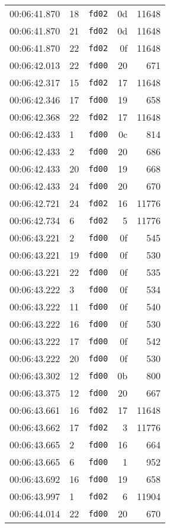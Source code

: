 \documentclass{article}
\begin{document}
\begin{longtable}{lllrr}
00:06:41.870 & 18 & \texttt{fd02} & 0d & 11648 \\
00:06:41.870 & 21 & \texttt{fd02} & 0d & 11648 \\
00:06:41.870 & 22 & \texttt{fd02} & 0f & 11648 \\
00:06:42.013 & 22 & \texttt{fd00} & 20 & 671 \\
00:06:42.317 & 15 & \texttt{fd02} & 17 & 11648 \\
00:06:42.346 & 17 & \texttt{fd00} & 19 & 658 \\
00:06:42.368 & 22 & \texttt{fd02} & 17 & 11648 \\
00:06:42.433 & 1 & \texttt{fd00} & 0c & 814 \\
00:06:42.433 & 2 & \texttt{fd00} & 20 & 686 \\
00:06:42.433 & 20 & \texttt{fd00} & 19 & 668 \\
00:06:42.433 & 24 & \texttt{fd00} & 20 & 670 \\
00:06:42.721 & 24 & \texttt{fd02} & 16 & 11776 \\
00:06:42.734 & 6 & \texttt{fd02} & 5 & 11776 \\
00:06:43.221 & 2 & \texttt{fd00} & 0f & 545 \\
00:06:43.221 & 19 & \texttt{fd00} & 0f & 530 \\
00:06:43.221 & 22 & \texttt{fd00} & 0f & 535 \\
00:06:43.222 & 3 & \texttt{fd00} & 0f & 534 \\
00:06:43.222 & 11 & \texttt{fd00} & 0f & 540 \\
00:06:43.222 & 16 & \texttt{fd00} & 0f & 530 \\
00:06:43.222 & 17 & \texttt{fd00} & 0f & 542 \\
00:06:43.222 & 20 & \texttt{fd00} & 0f & 530 \\
00:06:43.302 & 12 & \texttt{fd00} & 0b & 800 \\
00:06:43.375 & 12 & \texttt{fd00} & 20 & 667 \\
00:06:43.661 & 16 & \texttt{fd02} & 17 & 11648 \\
00:06:43.662 & 17 & \texttt{fd02} & 3 & 11776 \\
00:06:43.665 & 2 & \texttt{fd00} & 16 & 664 \\
00:06:43.665 & 6 & \texttt{fd00} & 1 & 952 \\
00:06:43.692 & 16 & \texttt{fd00} & 19 & 658 \\
00:06:43.997 & 1 & \texttt{fd02} & 6 & 11904 \\
00:06:44.014 & 22 & \texttt{fd00} & 20 & 670 \\

\end{longtable}
\end{document}
